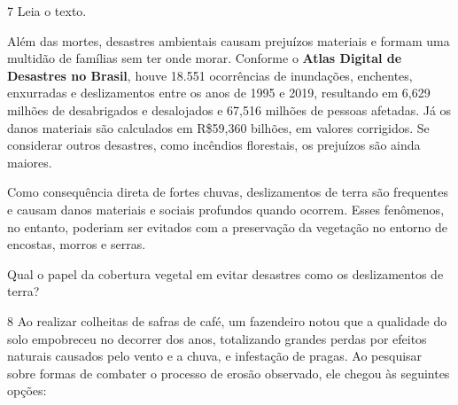 \num{7} Leia o texto.

\begin{myquote}\enlargethispage{2\baselineskip}
Além das mortes, desastres ambientais causam prejuízos materiais e
formam uma multidão de famílias sem ter onde morar. Conforme o
\textbf{Atlas Digital de Desastres no Brasil}, houve 18.551 ocorrências
de inundações, enchentes, enxurradas e deslizamentos entre os anos de
1995 e 2019, resultando em 6,629 milhões de desabrigados e desalojados e
67,516 milhões de pessoas afetadas. Já os danos materiais são calculados
em R\$59,360 bilhões, em valores corrigidos. Se considerar outros
desastres, como incêndios florestais, os prejuízos são ainda maiores.

\end{myquote}\pagebreak

Como consequência direta de fortes chuvas, deslizamentos de terra são
frequentes e causam danos materiais e sociais profundos quando ocorrem.
Esses fenômenos, no entanto, poderiam ser evitados com a preservação da
vegetação no entorno de encostas, morros e serras.

Qual o papel da cobertura vegetal em evitar desastres como os
deslizamentos de terra?


\num{8} Ao realizar colheitas de safras de café, um fazendeiro
notou que a qualidade do solo empobreceu no decorrer dos anos,
totalizando grandes perdas por efeitos naturais causados pelo vento e a
chuva, e infestação de pragas. Ao pesquisar sobre formas de combater o
processo de erosão observado, ele chegou às seguintes opções:

